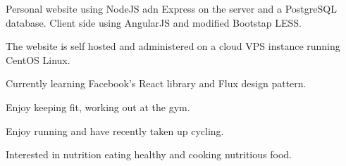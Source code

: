 \documentclass[a4paper]{deedy-resume} %
\begin{document}
\begin{minipage}[t]{0.66\textwidth}
\begin{tightitemize}
\item Personal website using NodeJS adn Express on the server and a PostgreSQL database. Client side using AngularJS and modified Bootstap LESS. 
\item The website is self hosted and administered on a cloud VPS instance running CentOS Linux. 
\item Currently learning Facebook's React library and Flux design pattern.
\end{tightitemize}
\sectionspace %


\descript{}
\begin{tightitemize}
\item Enjoy keeping fit, working out at the gym.
\item Enjoy running and have recently taken up cycling. 
\item Interested in nutrition eating healthy and cooking nutritious food. 
\end{tightitemize}
\sectionspace %


\end{minipage} %

\end{document}
